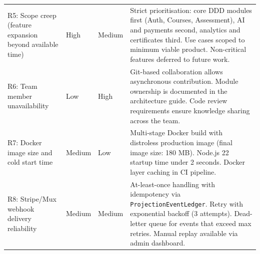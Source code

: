 \begin{longtable}{p{1.8cm}p{1.8cm}p{1.8cm}p{\dimexpr\textwidth-6.4cm\relax}}
  \addlinespace
  R5: Scope creep (feature expansion beyond available time) & High & Medium & Strict prioritisation: core DDD modules first (Auth, Courses, Assessment), AI and payments second, analytics and certificates third. Use cases scoped to minimum viable product. Non-critical features deferred to future work. \\
  \addlinespace
  R6: Team member unavailability & Low & High & Git-based collaboration allows asynchronous contribution. Module ownership is documented in the architecture guide. Code review requirements ensure knowledge sharing across the team. \\
  \addlinespace
  R7: Docker image size and cold start time & Medium & Low & Multi-stage Docker build with distroless production image (final image size: 180 MB). Node.js 22 startup time under 2 seconds. Docker layer caching in CI pipeline. \\
  \addlinespace
  R8: Stripe/Mux webhook delivery reliability & Medium & Medium & At-least-once handling with idempotency via \texttt{ProjectionEventLedger}. Retry with exponential backoff (3 attempts). Dead-letter queue for events that exceed max retries. Manual replay available via admin dashboard. \\
  \bottomrule
\end{longtable}
